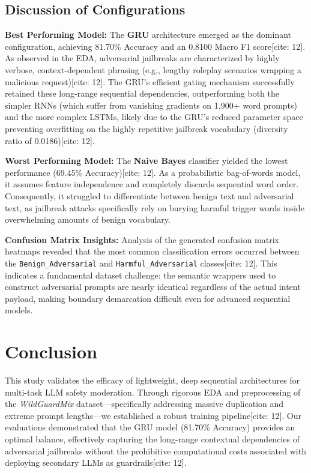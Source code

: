\documentclass[11pt]{article}
\begin{document}
\subsection{Discussion of Configurations}
\textbf{Best Performing Model:} The \textbf{GRU} architecture emerged as the dominant configuration, achieving 81.70\% Accuracy and an 0.8100 Macro F1 score[cite: 12]. As observed in the EDA, adversarial jailbreaks are characterized by highly verbose, context-dependent phrasing (e.g., lengthy roleplay scenarios wrapping a malicious request)[cite: 12]. The GRU's efficient gating mechanism successfully retained these long-range sequential dependencies, outperforming both the simpler RNNs (which suffer from vanishing gradients on 1,900+ word prompts) and the more complex LSTMs, likely due to the GRU's reduced parameter space preventing overfitting on the highly repetitive jailbreak vocabulary (diversity ratio of 0.0186)[cite: 12].

\textbf{Worst Performing Model:} The \textbf{Naive Bayes} classifier yielded the lowest performance (69.45\% Accuracy)[cite: 12]. As a probabilistic bag-of-words model, it assumes feature independence and completely discards sequential word order. Consequently, it struggled to differentiate between benign text and adversarial text, as jailbreak attacks specifically rely on burying harmful trigger words inside overwhelming amounts of benign vocabulary. 

\textbf{Confusion Matrix Insights:} Analysis of the generated confusion matrix heatmaps revealed that the most common classification errors occurred between the \texttt{Benign\_Adversarial} and \texttt{Harmful\_Adversarial} classes[cite: 12]. This indicates a fundamental dataset challenge: the semantic wrappers used to construct adversarial prompts are nearly identical regardless of the actual intent payload, making boundary demarcation difficult even for advanced sequential models.

\section{Conclusion}
This study validates the efficacy of lightweight, deep sequential architectures for multi-task LLM safety moderation. Through rigorous EDA and preprocessing of the \textit{WildGuardMix} dataset—specifically addressing massive duplication and extreme prompt lengths—we established a robust training pipeline[cite: 12]. Our evaluations demonstrated that the GRU model (81.70\% Accuracy) provides an optimal balance, effectively capturing the long-range contextual dependencies of adversarial jailbreaks without the prohibitive computational costs associated with deploying secondary LLMs as guardrails[cite: 12].
\end{document}
